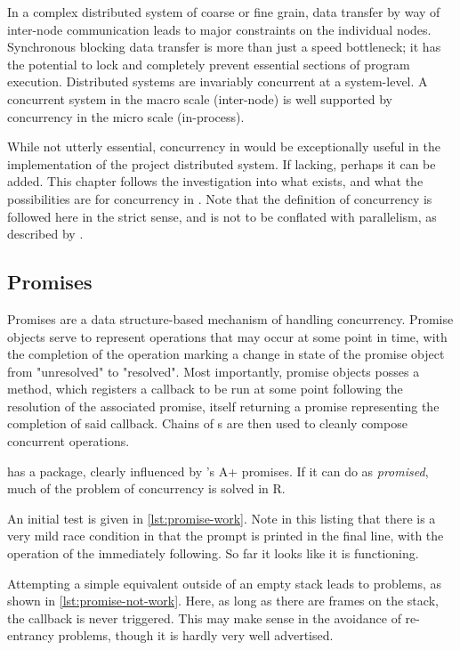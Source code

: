 In a complex distributed system of coarse or fine grain, data transfer by way of inter-node communication leads to major constraints on the individual nodes.
Synchronous blocking data transfer is more than just a speed bottleneck; it has the potential to lock and completely prevent essential sections of program execution.
Distributed systems are invariably concurrent at a system-level.
A concurrent system in the macro scale (inter-node) is well supported by concurrency in the micro scale (in-process).

While not utterly essential, concurrency in \R{} would be exceptionally useful in the implementation of the project distributed system.
If lacking, perhaps it can be added.
This chapter follows the investigation into what exists, and what the possibilities are for concurrency in \R{}.
Note that the definition of concurrency is followed here in the strict sense, and is not to be conflated with parallelism, as described by \textcite{pike2012concurrency}.

\subsection{Promises}\label{subsec:promises}

Promises are a data structure-based mechanism of handling concurrency\cite{liskov1988promises}.
Promise objects serve to represent operations that may occur at some point in time, with the completion of the operation marking a change in state of the promise object from "unresolved" to "resolved".
Most importantly, promise objects posses a  method, which registers a callback to be run at some point following the resolution of the associated promise, itself returning a promise representing the completion of said callback.
Chains of s are then used to cleanly compose concurrent operations.

\R{} has a  package, clearly influenced by 's A+ promises\cite{cheng2021promises}.
If it can do as \textit{promised}, much of the problem of concurrency is solved in R.

An initial test is given in \cref{lst:promise-work}.
Note in this listing that there is a very mild race condition in that the prompt is printed in the final line, with the operation of the  immediately following.
So far it looks like it is functioning.


Attempting a simple equivalent outside of an empty stack leads to problems, as shown in \cref{lst:promise-not-work}.
Here, as long as there are frames on the stack, the  callback is never triggered.
This may make sense in the avoidance of re-entrancy problems, though it is hardly very well advertised.

